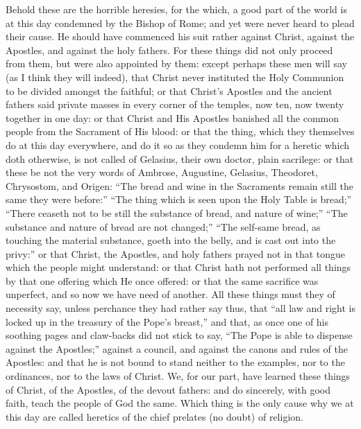 Behold these are the horrible heresies, for the which, a good part
of the world is at this day condemned by the Bishop of Rome; and yet
were never heard to plead their cause. He should have commenced
his suit rather against Christ, against the Apostles, and against the
holy fathers. For these things did not only proceed from them,
but were also appointed by them: except perhaps these men will say (as
I think they will indeed), that Christ never instituted the Holy Communion
to be divided amongst the faithful; or that Christ’s Apostles
and the ancient fathers said private masses in every corner of the temples,
now ten, now twenty together in one day: or that Christ and His Apostles
banished all the common people from the Sacrament of His blood: or that
the thing, which they themselves do at this day everywhere, and do it
so as they condemn him for a heretic which doth otherwise, is not called
of Gelasius, their own doctor, plain sacrilege: or that these be not
the very
words of Ambrose, Augustine, Gelasius, Theodoret, Chrysostom, and Origen:
“The bread and wine in the Sacraments remain still the same they
were before:” “The thing which is seen upon the Holy Table
is bread;” “There ceaseth not to be still the substance
of bread, and nature of wine;” “The substance and nature
of bread are not changed;” “The self-same bread, as touching
the material substance, goeth into the belly, and is cast out into the
privy:” or that Christ, the Apostles, and holy fathers prayed
not in that tongue which the people might understand: or that Christ
hath not performed all things by that one offering which He once offered:
or that the same sacrifice was unperfect, and so now we have need of
another. All these things must they of necessity say, unless perchance
they had rather say thus, that “all law and right is locked up
in the treasury of the Pope’s breast,” and that, as once
one of his soothing pages and claw-backs did not stick to say, “The
Pope is able to dispense against the Apostles;” against a council,
and against the canons and rules of the Apostles: and that he is not
bound to stand neither to the examples, nor to the ordinances, nor to
the laws of Christ. We, for our part, have learned these things
of Christ, of the Apostles, of the devout fathers: and do sincerely,
with good faith, teach the
people of God the same. Which thing is the only cause why we at
this day are called heretics of the chief prelates (no doubt) of religion.

